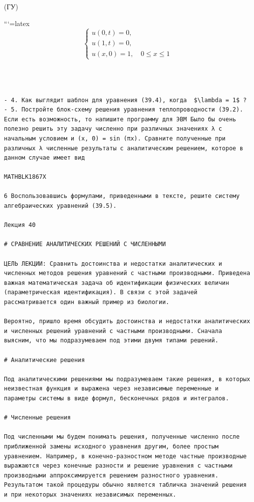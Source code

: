\documentclass[
]{article}
\begin{document}
(ГУ)

```{=latex}
\[
\begin{cases} u(0, t) = 0, \\ u(1, t) = 0, \\ u(x, 0) = 1, \quad 0 \le x \le 1 \end{cases}
\]

\begin{verbatim}

  

- 4. Как выглядит шаблон для уравнения (39.4), когда  $\lambda = 1$ ?
- 5. Постройте блок-схему решения уравнения теплопроводности (39.2). Если есть возможность, то напишите программу для ЭВМ Было бы очень полезно решить эту задачу численно при различных значениях λ с начальным условием и (x, 0) = sin (πx). Сравните полученные при различных λ численные результаты с аналитическим решением, которое в данном случае имеет вид

MATHBLK1867X

6 Воспользовавшись формулами, приведенными в тексте, решите систему алгебраических уравнений (39.5).

Лекция 40

# СРАВНЕНИЕ АНАЛИТИЧЕСКИХ РЕШЕНИЙ С ЧИСЛЕННЫМИ

ЦЕЛЬ ЛЕКЦИИ: Сравнить достоинства и недостатки аналитических и численных методов решения уравнений с частными производными. Приведена важная математическая задача об идентификации физических величин (параметрическая идентификация). В связи с этой задачей рассматривается один важный пример из биологии.

Вероятно, пришло время обсудить достоинства и недостатки аналитических и численных решений уравнений с частными производными. Сначала выясним, что мы подразумеваем под этими двумя типами решений.

# Аналитические решения

Под аналитическими решениями мы подразумеваем такие решения, в которых неизвестная функция и выражена через независимые переменные и параметры системы в виде формул, бесконечных рядов и интегралов.

# Численные решения

Под численными мы будем понимать решения, полученные численно после приближенной замены исходного уравнения другим, более простым уравнением. Например, в конечно-разностном методе частные производные выражаются через конечные разности и решение уравнения с частными производными аппроксимируется решением разностного уравнения. Результатом такой процедуры обычно является табличка значений решения и при некоторых значениях независимых переменных.


\end{verbatim}
\end{document}
